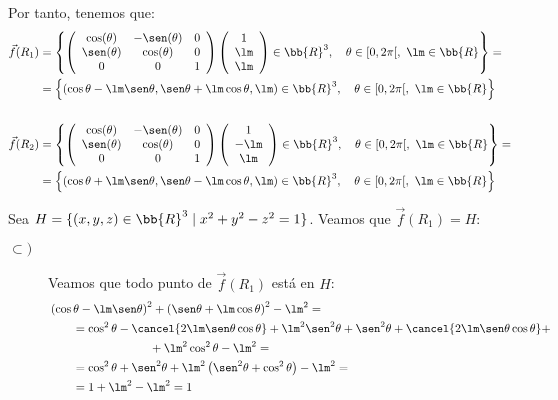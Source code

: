 \begin{ejercicio}
\begin{enumerate}
        Por tanto, tenemos que:
        \begin{align*}
            \vec{f}(R_1) &= \left\{\left(\begin{array}{ccc}
                \cos(\theta) & -\sen(\theta) & 0\\ 
                \sen(\theta) & \cos(\theta) & 0 \\
                0 & 0 & 1
            \end{array}\right) \left(\begin{array}{c}
                1 \\ \lm \\ \lm
            \end{array}\right)\in\bb{R}^3,\quad \theta\in [0,2\pi[,~\lm\in\bb{R}\right\}
            =\\&= \left\{\left(
                \cos\theta - \lm \sen\theta, \sen\theta + \lm \cos\theta, \lm
            \right)\in\bb{R}^3,\quad \theta\in [0,2\pi[,~\lm\in\bb{R}\right\}
            \\ &\\
            \vec{f}(R_2) &= \left\{\left(\begin{array}{ccc}
                \cos(\theta) & -\sen(\theta) & 0\\ 
                \sen(\theta) & \cos(\theta) & 0 \\
                0 & 0 & 1
            \end{array}\right) \left(\begin{array}{c}
                1 \\ -\lm \\ \lm
            \end{array}\right)\in\bb{R}^3,\quad \theta\in [0,2\pi[,~\lm\in\bb{R}\right\}
            =\\&= \left\{\left(
                \cos\theta + \lm \sen\theta, \sen\theta - \lm \cos\theta, \lm
            \right)\in\bb{R}^3,\quad \theta\in [0,2\pi[,~\lm\in\bb{R}\right\}
        \end{align*}

        Sea $H=\{(x,y,z)\in \bb{R}^3 \mid x^2+y^2-z^2=1\}$. Veamos que $\vec{f}(R_1)=H$:
        \begin{description}
            \item[$\subset)$] Veamos que todo punto de $\vec{f}(R_1)$ está en $H$:
            \begin{align*}
                &\left(\cos\theta - \lm \sen\theta\right)^2 + \left(\sen\theta + \lm \cos\theta\right)^2 - \lm^2
                =\\&\qquad = \cos^2\theta - \cancel{2\lm\sen\theta\cos\theta} + \lm^2\sen^2\theta + \sen^2\theta + \cancel{2\lm\sen\theta\cos\theta} +\\&\hspace{3cm}+ \lm^2\cos^2\theta - \lm^2
                =\\&\qquad = \cos^2\theta + \sen^2\theta +\lm^2\left(\sen^2\theta + \cos^2\theta\right) - \lm^2
                =\\&\qquad = 1 + \lm^2 - \lm^2 = 1
            \end{align*}


\end{description}
\end{enumerate}
\end{ejercicio}
